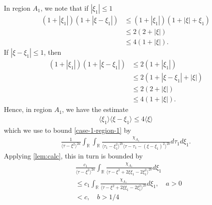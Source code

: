 \documentclass[12pt,reqno]{amsart}
\numberwithin{equation}{section}  %
\numberwithin{figure}{section}
\newcommand{\rr}{\mathbb{R}}
\theoremstyle{plain}
\theoremstyle{definition}
\theoremstyle{remark}
\begin{document}
In region $A_{1}$, we note that if $| \xi_{1} | \le 1$
%
%
%
%
\begin{equation*}
\begin{split}
  (1 + | \xi_{1} |)(1 + | \xi - \xi_{1} |)
  & \le (1 + | \xi_{1} |)(1 + | \xi | + \xi_{1})
  \\
  & \le 2 (2 + | \xi |)
  \\
  & \le 4 (1 + | \xi |).
\end{split}
\end{equation*}
%
%
If $| \xi - \xi_{1} |\le 1$, then
%
%
\begin{equation*}
\begin{split}
  (1 + | \xi_{1} |)(1 + | \xi - \xi_{1} |)
  & \le 2 (1 + | \xi_{1} |)
  \\
  & \le 2 (1 + | \xi - \xi_{1} | + | \xi |)
  \\
  & \le 2(2 + | \xi |)
  \\
  & \le 4 (1 + | \xi |).
\end{split}
\end{equation*}
%
%
Hence, in region $A_{1}$, we have the estimate
%
%
\begin{equation}
\begin{split}
  \langle \xi_{1} \rangle \langle \xi - \xi_{1} \rangle  \le 4 \langle \xi \rangle 
\end{split}
\label{splitting-estimate}
\end{equation}
%
%
which we use to bound \eqref{case-1-region-1} by
%
%
%
%
\begin{equation*}
\begin{split}
    \frac{ 1}{\langle \tau - \xi^{2} \rangle ^{2a}}
    \int_{\rr} \int_{\rr} \frac{\chi_{A_{1}}}{  
    \langle \tau_{1} - \xi_{1}^{2} \rangle^{2b} \langle  \tau - \tau_{1} -
    (\xi - \xi_{1})^{2} \rangle^{2b} }
    d \tau_1 d \xi_{1}.
\end{split}
\end{equation*}
%
%
Applying \autoref{lem:calc}, this in turn is bounded by
%
%
\begin{equation}
  \label{uniform-bound-region-1}
\begin{split}
  & \frac{c_{1}}{\langle \tau - \xi^{2} \rangle^{2a}} \int_{\rr}
  \frac{\chi_{A_{1}}}{\langle \tau - \xi^{2} + 2 \xi \xi_{1} - 2
  \xi_{1}^{2} \rangle ^{2b}} d \xi_{1}
  \\
  & \le c_{1} \int_{\rr}
  \frac{\chi_{A_{1}}}{\langle \tau - \xi^{2} + 2 \xi \xi_{1} - 2
  \xi_{1}^{2} \rangle ^{2b}} d \xi_{1}, \quad a > 0
  \\
& < c, \quad b > 1/4
\end{split}
\end{equation}
\end{document}
